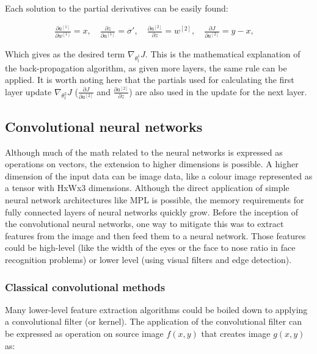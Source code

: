 Each solution to the partial derivatives can be easily found:

\begin{align*}
\frac{\partial a^{[1]}}{\partial w^{[1]}} = x, \quad
\frac{\partial z}{\partial a^{[1]}} = \sigma\prime, \quad
\frac{\partial a^{[2]}}{\partial z} = w^{[2]}, \quad
\frac{\partial J}{\partial a^{[2]}} = y - x, \quad
\end{align*}

Which gives as the desired term $\nabla_{\theta^{1}_{t}}J$.
This is the mathematical explanation of the back-propagation algorithm, as given more layers, the same rule can be applied.
It is worth noting here that the partials used for calculating the first layer update $\nabla_{\theta^{2}_{t}}J$ ($\frac{\partial J}{\partial a^{[2]}}$ and $\frac{\partial a^{[2]}}{\partial z}$) are also used in the update for the next layer.

\subsection{Convolutional neural networks}

Although much of the math related to the neural networks is expressed as operations on vectors, the extension to higher dimensions is possible.
A higher dimension of the input data can be image data, like a colour image represented as a tensor with HxWx3 \footnotemark {} dimensions.
Although the direct application of simple neural network architectures like MPL is possible, the memory requirements for fully connected layers of neural networks quickly grow.
Before the inception of the convolutional neural networks, one way to mitigate this was to extract features from the image and then feed them to a neural network. Those features could be high-level (like the width of the eyes or the face to nose ratio in face recognition problems) or lower level (using visual filters and edge detection).

\subsubsection{Classical convolutional methods}
Many lower-level feature extraction algorithms could be boiled down to applying a convolutional filter (or kernel).
The application of the convolutional filter can be expressed as operation on source image $f(x,y)$ that creates image $g(x,y)$ as:

